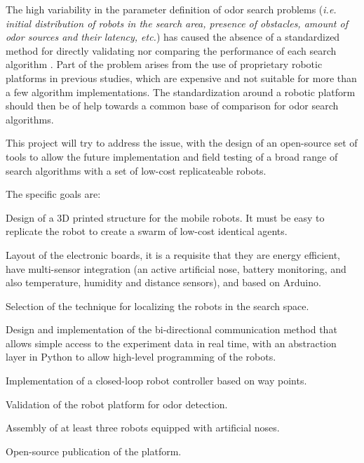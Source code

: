 




\vspace{-0.5cm}

The high variability in the parameter definition of odor search problems (\emph{i.e. initial distribution of robots in the search area, presence of obstacles, amount of odor sources and their latency, etc.}) has caused the absence of a standardized method for directly validating nor comparing the performance of each search algorithm \cite{Mcgill2011}.
Part of the problem arises from the use of proprietary robotic platforms in previous studies, which are expensive and not suitable for more than a few algorithm implementations. The standardization around a robotic platform should then be of help towards a common base of comparison for odor search algorithms.

This project will try to address the issue, with the design of an open-source set of tools to allow the future implementation and field testing of a broad range of search algorithms with a set of low-cost replicateable robots.

The specific goals are:

\vspace{-0.5cm}

\begin{packed_enum}
	\item Design of a 3D printed structure for the mobile robots. It must be easy to replicate the robot to create a swarm of low-cost identical agents.
	\item Layout of the electronic boards, it is a requisite that they are energy efficient, have multi-sensor integration (an active artificial nose, battery monitoring, and also temperature, humidity and distance sensors), and based on Arduino.
	\item Selection of the technique for localizing the robots in the search space.
	\item Design and implementation of the bi-directional communication method that allows simple access to the experiment data in real time, with an abstraction layer in Python to allow high-level programming of the robots.
	\item Implementation of a closed-loop robot controller based on way points.
	\item Validation of the robot platform for odor detection.
	\item Assembly of at least three robots equipped with artificial noses.
	\item Open-source publication of the platform.
\end{packed_enum}

